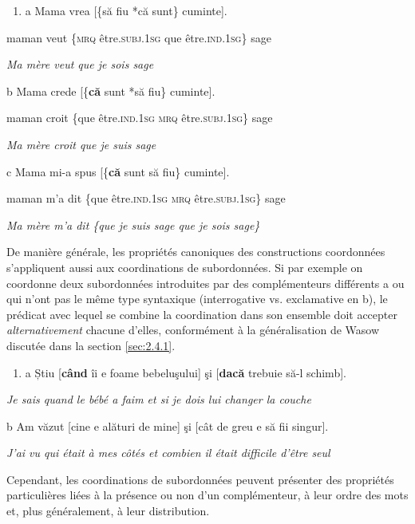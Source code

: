 \begin{enumerate}
\item \label{bkm:Ref301346779}a  Mama  vrea  [\{să  fiu  {\textbar} *că  sunt\}  cuminte].


\end{enumerate}
maman  veut  \{\textsc{mrq } être.\textsc{subj.1sg}  {\textbar} que  être.\textsc{ind.1sg\}}  sage

{\itshape
Ma mère veut que je sois sage}

  b  Mama  crede  [\{\textbf{că}  sunt  {\textbar} *să  fiu\}  cuminte].

    maman  croit  \{que  être.\textsc{ind.1sg}  {\textbar} \textsc{mrq } être.\textsc{subj.1sg\}}  sage 

{\itshape
Ma mère croit que je suis sage}

  c  Mama  mi-a  spus  [\{\textbf{că}  sunt  {\textbar} să  fiu\}  cuminte].

    maman  m'a  dit  \{que  être.\textsc{ind.1sg}  {\textbar} \textsc{mrq } être.\textsc{subj.1sg\}}  sage 

{\itshape
Ma mère m'a dit \{que je suis sage {\textbar} que je sois sage\}}

De manière générale, les propriétés canoniques des constructions coordonnées s'appliquent aussi aux coordinations de subordonnées. Si par exemple on coordonne deux subordonnées introduites par des complémenteurs différents a ou qui n'ont pas le même type syntaxique (interrogative vs. exclamative en b), le prédicat avec lequel se combine la coordination dans son ensemble doit accepter \textit{alternativement} chacune d'elles, conformément à la généralisation de Wasow discutée dans la section \ref{sec:2.4.1}. 


\begin{enumerate}
\item \label{bkm:Ref273464899}a  Știu [\textbf{când} îi e foame bebeluşului] şi [\textbf{dacă} trebuie să-l schimb].


\end{enumerate}
{\itshape
Je sais quand le bébé a faim et si je dois lui changer la couche}

  b  Am văzut [cine e alături de mine] şi [cât de greu e să fii singur].

{\itshape
J'ai vu qui était à mes côtés et combien il était difficile d'être seul}

Cependant, les coordinations de subordonnées peuvent présenter des propriétés particulières liées à la présence ou non d'un complémenteur, à leur ordre des mots et, plus généralement, à leur distribution.

